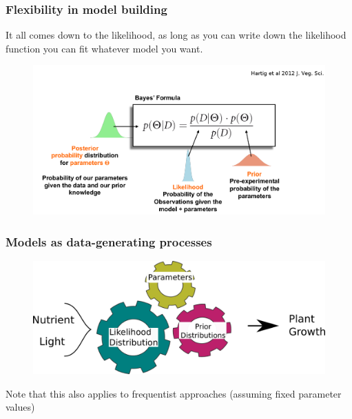 \documentclass{beamer}
\begin{document}
  \begin{frame}
  \frametitle{\bf Flexibility in model building}
  
  It all comes down to the likelihood, as long as you can write down the likelihood function you can fit whatever model you want.
  
  \begin{figure}
   \includegraphics[width=.7\textwidth,height=.6\textheight,keepaspectratio]{summ.png}
  \end{figure}

  
 \end{frame}
 
 \begin{frame}
  \frametitle{\bf Models as data-generating processes}
  
  \begin{figure}
   \includegraphics[width=\textwidth,height=.7\textheight,keepaspectratio]{cogs_f.png}
  \end{figure}

  Note that this also applies to frequentist approaches (assuming fixed parameter values)
  
 \end{frame}
\end{document}
